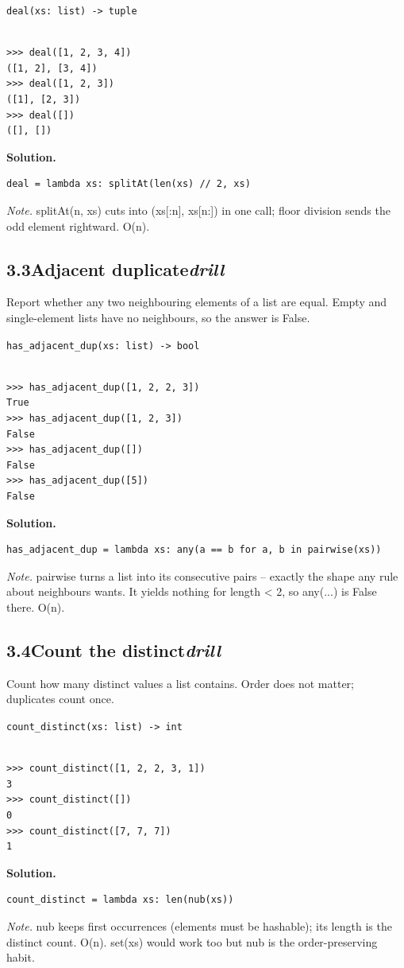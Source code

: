 \documentclass[10pt,letterpaper]{book}
\begin{document}
\noindent\texttt{deal(xs: list) -> tuple}
\begin{lstlisting}[style=ex]

>>> deal([1, 2, 3, 4])
([1, 2], [3, 4])
>>> deal([1, 2, 3])
([1], [2, 3])
>>> deal([])
([], [])

\end{lstlisting}
\noindent\textbf{Solution.}
\begin{lstlisting}[style=code]
deal = lambda xs: splitAt(len(xs) // 2, xs)
\end{lstlisting}
\noindent\textit{Note.} splitAt(n, xs) cuts into (xs[:n], xs[n:]) in one call; floor division sends the odd element rightward. O(n).

\subsection*{3.3\quad Adjacent duplicate\hfill\textnormal{\textit{drill}}}
Report whether any two neighbouring elements of a list are equal. Empty and single-element lists have no neighbours, so the answer is False.

\noindent\texttt{has\_adjacent\_dup(xs: list) -> bool}
\begin{lstlisting}[style=ex]

>>> has_adjacent_dup([1, 2, 2, 3])
True
>>> has_adjacent_dup([1, 2, 3])
False
>>> has_adjacent_dup([])
False
>>> has_adjacent_dup([5])
False

\end{lstlisting}
\noindent\textbf{Solution.}
\begin{lstlisting}[style=code]
has_adjacent_dup = lambda xs: any(a == b for a, b in pairwise(xs))
\end{lstlisting}
\noindent\textit{Note.} pairwise turns a list into its consecutive pairs -- exactly the shape any rule about neighbours wants. It yields nothing for length < 2, so any(...) is False there. O(n).

\subsection*{3.4\quad Count the distinct\hfill\textnormal{\textit{drill}}}
Count how many distinct values a list contains. Order does not matter; duplicates count once.

\noindent\texttt{count\_distinct(xs: list) -> int}
\begin{lstlisting}[style=ex]

>>> count_distinct([1, 2, 2, 3, 1])
3
>>> count_distinct([])
0
>>> count_distinct([7, 7, 7])
1

\end{lstlisting}
\noindent\textbf{Solution.}
\begin{lstlisting}[style=code]
count_distinct = lambda xs: len(nub(xs))
\end{lstlisting}
\noindent\textit{Note.} nub keeps first occurrences (elements must be hashable); its length is the distinct count. O(n). set(xs) would work too but nub is the order-preserving habit.
\end{document}
